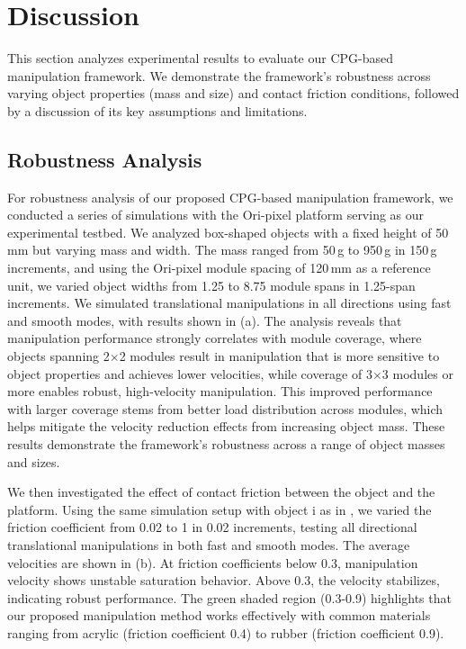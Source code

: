 \section{Discussion}
\label{sec:discussion}
This section analyzes experimental results to evaluate our CPG-based manipulation framework. We demonstrate the framework's robustness across varying object properties (mass and size) and contact friction conditions, followed by a discussion of its key assumptions and limitations.

\subsection{Robustness Analysis}
\label{sec:robustness}
For robustness analysis of our proposed CPG-based manipulation framework, we conducted a series of simulations with the Ori-pixel platform serving as our experimental testbed. We analyzed box-shaped objects with a fixed height of 50\,mm but varying mass and width. The mass ranged from 50\,g to 950\,g in 150\,g increments, and using the Ori-pixel module spacing of 120\,mm as a reference unit, we varied object widths from 1.25 to 8.75 module spans in 1.25-span increments. We simulated translational manipulations in all directions using fast and smooth modes, with results shown in (a). The analysis reveals that manipulation performance strongly correlates with module coverage, where objects spanning 2$\times$2 modules result in manipulation that is more sensitive to object properties and achieves lower velocities, while coverage of 3$\times$3 modules or more enables robust, high-velocity manipulation. This improved performance with larger coverage stems from better load distribution across modules, which helps mitigate the velocity reduction effects from increasing object mass. These results demonstrate the framework's robustness across a range of object masses and sizes.

We then investigated the effect of contact friction between the object and the platform. Using the same simulation setup with object i as in , we varied the friction coefficient from 0.02 to 1 in 0.02 increments, testing all directional translational manipulations in both fast and smooth modes. The average velocities are shown in (b). At friction coefficients below 0.3, manipulation velocity shows unstable saturation behavior. Above 0.3, the velocity stabilizes, indicating robust performance. The green shaded region (0.3-0.9) highlights that our proposed manipulation method works effectively with common materials ranging from acrylic (friction coefficient 0.4) to rubber (friction coefficient 0.9).

